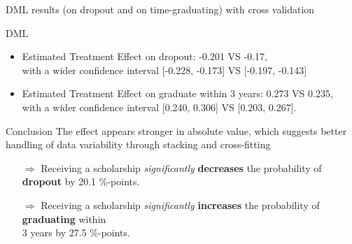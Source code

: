 \documentclass[aspectratio=169]{beamer}
\begin{document}
\begin{frame}{DML results (on dropout and on time-graduating) with cross validation}

\vspace{10pt}
\begin{alertblock}{DML}
	\begin{itemize}[label=--,itemsep=1pt,topsep=2pt]
	\item Estimated Treatment Effect on dropout: -0.201 VS -0.17,\\ with a wider confidence interval [-0.228, -0.173] VS   [-0.197, -0.143]
	\item Estimated Treatment Effect on graduate within 3 years:  0.273 VS 0.235,\\ 
    with a wider confidence interval [0.240, 0.306] VS [0.203, 0.267].
	
\end{itemize}
\end{alertblock}
\vspace{3pt}

\begin{exampleblock}{Conclusion}
\vspace{-2pt}
The effect appears stronger in absolute value, which suggests better handling of data variability through stacking and cross-fitting
\begin{itemize}

    \item [$\Rightarrow$]Receiving a scholarship \textit{significantly} \textbf{decreases} the probability of \textbf{dropout} by 20.1 \%-points.
    \item [$\Rightarrow$]Receiving a scholarship \textit{significantly} \textbf{increases} the probability of \textbf{graduating} within \\ 3 years by 27.5 \%-points.
\end{itemize}
\vspace{-3pt}
	
\end{exampleblock}

    
\end{frame}
\end{document}
